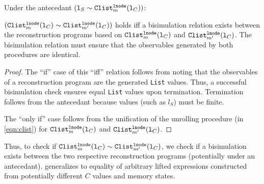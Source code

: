 \begin{theorem}\label{theorem:clistsEqual}
Under the antecedant
$({\tt l}_S \sim{} {\tt Clist}_m^{{\tt lnode}}({\tt l}_C))$:

$({\tt Clist}_m^{{\tt lnode}}({\tt l}_C)
\sim{}
{\tt Clist}_{m'}^{{\tt lnode}}({\tt l}_C))$
holds iff a bisimulation relation
exists between the reconstruction programs
based on ${\tt Clist}_m^{{\tt lnode}}({\tt l}_C)$
and
${\tt Clist}_{m'}^{{\tt lnode}}({\tt l}_C)$.
The bisimulation relation must ensure that the
observables generated by both procedures are
identical.
\end{theorem}
\begin{proof}\let\qed\relax
The ``if'' case of this ``iff'' relation follows
from noting that the observables of
a reconstruction program are the
generated {\tt List} values. Thus, a
successful bisimulation
check ensures equal
{\tt List}
values upon termination. Termination
follows from the antecedant because
\SpecL{} values (such as $l_S$) must be finite.

The ``only if'' case
follows from the unification of the
unrolling procedure (in \cref{eqn:clist}) for
${\tt Clist}_m^{{\tt lnode}}({\tt l}_C)$
and
${\tt Clist}_{m'}^{{\tt lnode}}({\tt l}_C)$.

\end{proof}

Thus, to check if ${\tt Clist}_m^{{\tt lnode}}({\tt l}_C)
\sim{} {\tt Clist}_{m'}^{{\tt lnode}}({\tt l}_C)$, we
check if a bisimulation exists
between the two respective reconstruction programs (potentially
under an antecedant).   generalizes
to equality of arbitrary lifted expressions constructed from potentially
different $C$ values and memory states.

